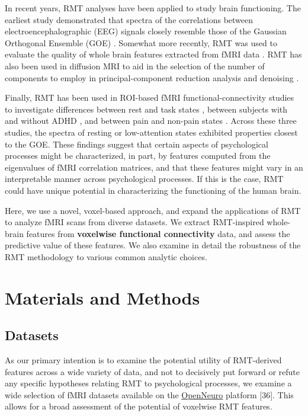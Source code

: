 \documentclass[NETN,manuscript]{stjour-new}
\begin{document}
In recent years, RMT analyses have been applied to study brain functioning.  The earliest  study
demonstrated that spectra of the correlations between electroencephalographic (EEG) signals closely
resemble those of the Gaussian Orthogonal Ensemble (GOE) \citep{sebaRandomMatrixAnalysis2003}.
Somewhat more recently, RMT was used to evaluate the quality of whole brain features extracted from
fMRI data \citep{voultsidouFeatureEvaluationFMRI2007,verganiRestingStateFMRI2019}. RMT has also
been used in diffusion MRI to aid in the selection of the number of components to employ in
principal-component reduction analysis and denoising
\citep{veraartDenoisingDiffusionMRI2016,verganiRestingStateFMRI2019,ulfarssonDimensionEstimationNoisy2008}.

Finally, RMT has been used in ROI-based fMRI functional-connectivity studies to investigate
differences between rest and task states \citep{wangSpectralPropertiesTemporal2015}, between
subjects with and without ADHD \citep{wangRandomMatrixTheory2016}, and between pain and non-pain
states \citep{matharooSpontaneousBackpainAlters2020}. Across these three studies, the spectra of
resting or low-attention states exhibited properties closest to the GOE. These findings suggest that
certain aspects of psychological processes might be characterized, in part, by features computed
from the eigenvalues of fMRI correlation matrices, and that these features might vary in an
interpretable manner across psychological processes. If this is the case, RMT could have unique
potential in characterizing the functioning of the human brain.

Here, we use a novel, voxel-based approach, and expand the applications of RMT to analyze fMRI scans
from  diverse datasets. We extract RMT-inspired whole-brain features from \textbf{voxelwise
functional connectivity} data, and assess the predictive value of these features. We also examine in
detail the robustness of the RMT methodology to various common analytic choices.

\section{Materials and Methods}

\subsection{Datasets}

As our primary intention is to examine the potential utility of RMT-derived features across a wide
variety of data, and not to decisively put forward or refute any specific hypotheses relating RMT to
psychological processes, we examine a wide selection of fMRI datasets available on the
\href{https://openneuro.org/}{OpenNeuro} platform [36].  This allows for a broad assessment of the
potential of voxelwise RMT features.
\end{document}
